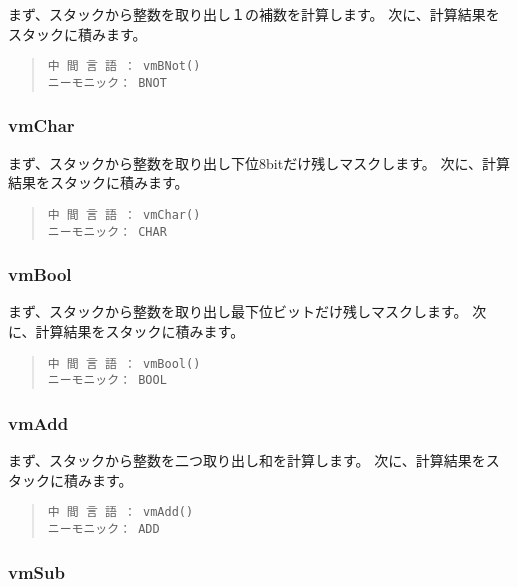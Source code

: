まず、スタックから整数を取り出し１の補数を計算します。
次に、計算結果をスタックに積みます。

\begin{quote}
\begin{verbatim}
中 間 言 語 ： vmBNot()
ニーモニック： BNOT
\end{verbatim}
\end{quote}

\subsubsection{vmChar}

まず、スタックから整数を取り出し下位8bitだけ残しマスクします。
次に、計算結果をスタックに積みます。

\begin{quote}
\begin{verbatim}
中 間 言 語 ： vmChar()
ニーモニック： CHAR
\end{verbatim}
\end{quote}

\subsubsection{vmBool}

まず、スタックから整数を取り出し最下位ビットだけ残しマスクします。
次に、計算結果をスタックに積みます。

\begin{quote}
\begin{verbatim}
中 間 言 語 ： vmBool()
ニーモニック： BOOL
\end{verbatim}
\end{quote}

\subsubsection{vmAdd}

まず、スタックから整数を二つ取り出し和を計算します。
次に、計算結果をスタックに積みます。

\begin{quote}
\begin{verbatim}
中 間 言 語 ： vmAdd()
ニーモニック： ADD
\end{verbatim}
\end{quote}

\subsubsection{vmSub}

